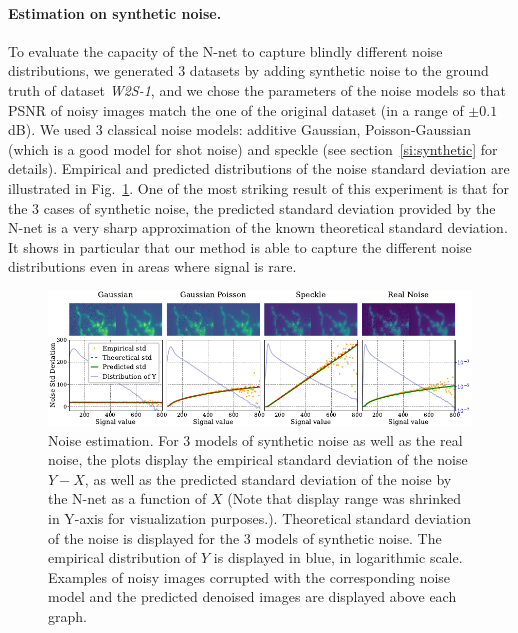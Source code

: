 \documentclass{article}
\begin{document}
\paragraph{Estimation on synthetic noise.}
To evaluate the capacity of the N-net to capture blindly different noise distributions, we generated 3 datasets by adding synthetic noise to the ground truth of dataset \textit{W2S-1}, and we chose the parameters of the noise models so that PSNR of noisy images match the one of the original dataset (in a range of $\pm0.1$dB).
We used 3 classical noise models: additive Gaussian, Poisson-Gaussian (which is a good model for shot noise) and speckle (see section~\ref{si:synthetic} for details).
Empirical and predicted distributions of the noise standard deviation are illustrated in Fig.~\ref{fig:noisestd}.
One of the most striking result of this experiment is that for the 3 cases of synthetic noise, the predicted standard deviation provided by the N-net is a very sharp approximation of the known theoretical standard deviation.
It shows in particular that our method is able to capture the different noise distributions even in areas where signal is rare.
\begin{figure}[!htbp]
\vskip -0.1in
\begin{center}
\centerline{\includegraphics[width=\textwidth]{fig_noise_std_1col.pdf}}
\caption[Noise estimation]{Noise estimation.
For 3 models of synthetic noise as well as the real noise, the plots display the empirical standard deviation of the noise $Y - X$, as well as the predicted standard deviation of the noise by the N-net as a function of $X$ (Note that display range was shrinked in Y-axis for visualization purposes.).
Theoretical standard deviation of the noise is displayed for the 3 models of synthetic noise.
The empirical distribution of $Y$ is displayed in blue, in logarithmic scale.
Examples of noisy images corrupted with the corresponding noise model and the predicted denoised images are displayed above each graph.}
\label{fig:noisestd}
\end{center}
\end{figure}
\end{document}
